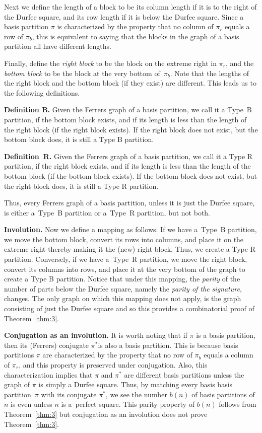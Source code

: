 \documentclass[10pt,a4paper]{amsart}
\numberwithin{equation}{section}
\theoremstyle{definition}
\begin{document}
Next we define the length of a block to be its column length if it is
to the right of the Durfee square, and its row length if it is below
the Durfee square. Since a basis partition $\pi$ is characterized by the
property that no column of $\pi_r$ equals a row of $\pi_b$, this is
equivalent to saying that the blocks in the graph of a basis partition
all have different lengths.

Finally, define the {\it right block} to be the block on the extreme
right in $\pi_r$, and the {\it bottom block} to be the block at the
very bottom of~$\pi_b$. Note that the lengths of the right block and
the bottom block (if they exist) are different. This leads us to the following definitions.

{\bf Definition B.} Given the Ferrers graph of a basis partition, we call
it a Type~B partition, if the bottom block exists, and if its length is
less than the length of the right block (if the right block exists).
If the right block does not exist, but the bottom block does, it is
still a Type B partition.

{\bf Definition~R.} Given the Ferrers graph of a basis partition, we call
it a Type R partition, if the right block exists, and if its length is
less than the length of the bottom block (if the bottom block exists).
If the bottom block does not exist, but the right block does, it is
still a Type R partition.

Thus, every Ferrers graph of a basis partition, unless it is just the
Durfee square, is either a~Type~B partition or a~Type~R partition, but
not both.

{\bf Involution.} Now we define a mapping as follows. If we have
a~Type~B partition,
we move the bottom block, convert its rows into columns, and place it
on the extreme right thereby making it the (new) right block. Thus, we
create a Type R partition. Conversely, if we have a~Type~R partition,
we move the right block, convert its columns into rows, and place it
at the very bottom of the graph to create a Type B partition. Notice
that under this mapping, the {\it parity} of the number of parts below
the Durfee square, namely the {\it parity of the signature}, changes. The
only graph on which this mapping does not apply, is the graph consisting
of just the Durfee square and so this provides a combinatorial proof of
Theorem~\ref{thm:3}.

{\bf Conjugation as an involution.} It is worth noting that if $\pi$ is
a basis partition, then its (Ferrers) conjugate $\pi^*$is also a basis
partition. This is because basis partitions $\pi$ are characterized by
the property that no row of $\pi_b$ equals a column of $\pi_r$, and this
property is preserved under conjugation. Also, this characterization
implies that $\pi$ and $\pi^*$ are different basis partitions unless
the graph of $\pi$ is simply a Durfee square. Thus, by matching every basis
basis partition~$\pi$ with its conjugate $\pi^*$, we see the number
$b(n)$ of basis partitions of $n$ is even unless $n$ is a~perfect square.
This parity property of $b(n)$ follows from Theorem~\ref{thm:3} but conjugation
as an involution does not prove Theorem~\ref{thm:3}.
\end{document}
